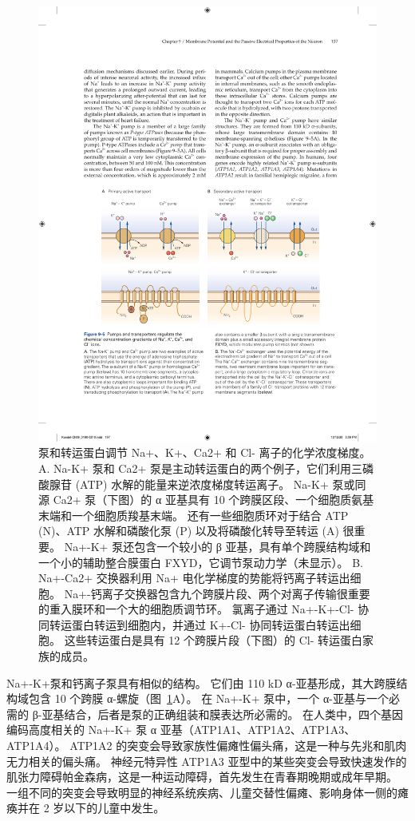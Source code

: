 \begin{figure}[htbp]
	\centering
	\includegraphics[width=0.7\linewidth]{chap09/fig_9_5}
	\caption{泵和转运蛋白调节 Na+、K+、Ca2+ 和 Cl- 离子的化学浓度梯度。 A. Na-K+ 泵和 Ca2+ 泵是主动转运蛋白的两个例子，它们利用三磷酸腺苷 (ATP) 水解的能量来逆浓度梯度转运离子。 Na-K+ 泵或同源 Ca2+ 泵（下图）的 α 亚基具有 10 个跨膜区段、一个细胞质氨基末端和一个细胞质羧基末端。 还有一些细胞质环对于结合 ATP (N)、ATP 水解和磷酸化泵 (P) 以及将磷酸化转导至转运 (A) 很重要。 Na+-K+ 泵还包含一个较小的 β 亚基，具有单个跨膜结构域和一个小的辅助整合膜蛋白 FXYD，它调节泵动力学（未显示）。 B. Na+-Ca2+ 交换器利用 Na+ 电化学梯度的势能将钙离子转运出细胞。 Na+-钙离子交换器包含九个跨膜片段、两个对离子传输很重要的重入膜环和一个大的细胞质调节环。 氯离子通过 Na+-K+-Cl- 协同转运蛋白转运到细胞内，并通过 K+-Cl- 协同转运蛋白转运出细胞。 这些转运蛋白是具有 12 个跨膜片段（下图）的 Cl- 转运蛋白家族的成员。}
	\label{fig:9_5}
\end{figure}


Na+-K+泵和钙离子泵具有相似的结构。
它们由 110 kD α-亚基形成，其大跨膜结构域包含 10 个跨膜 α-螺旋（图~\ref{fig:9_5}A）。
在 Na+-K+ 泵中，一个 α-亚基与一个必需的 β-亚基结合，后者是泵的正确组装和膜表达所必需的。
在人类中，四个基因编码高度相关的 Na+-K+ 泵 α 亚基（ATP1A1、ATP1A2、ATP1A3、ATP1A4）。
ATP1A2 的突变会导致家族性偏瘫性偏头痛，这是一种与先兆和肌肉无力相关的偏头痛。
神经元特异性 ATP1A3 亚型中的某些突变会导致快速发作的肌张力障碍帕金森病，这是一种运动障碍，首先发生在青春期晚期或成年早期。
一组不同的突变会导致明显的神经系统疾病、儿童交替性偏瘫、影响身体一侧的瘫痪并在 2 岁以下的儿童中发生。


